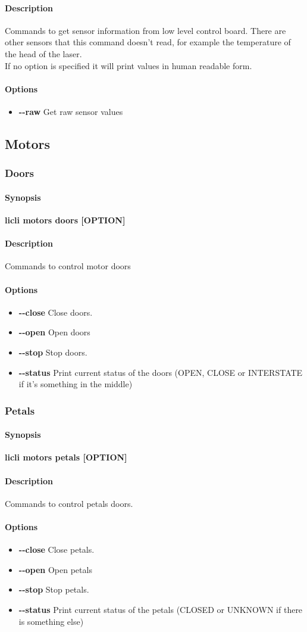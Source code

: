 \documentclass[letterpaper, 10 pt]{article}
\newcommand{\cmdsection}[1]{\paragraph{#1}\mbox{}\par}
\begin{document}
\cmdsection{Description} Commands to get sensor information from low level control board. There are other sensors that this command doesn't read, for example the temperature of the head of the laser.\\
If no option is specified it will print values in human readable form.\\
\cmdsection{Options}
\begin{itemize}
	\item[] \textbf{-{}-raw} Get raw sensor values
\end{itemize}

\subsection{Motors}
\subsubsection{Doors}
\cmdsection{Synopsis} \textbf{licli motors doors [OPTION]}\\

\cmdsection{Description} Commands to control motor doors \\
\cmdsection{Options}
\begin{itemize}
	\item[] \textbf{-{}-close} Close doors.
	\item[] \textbf{-{}-open} Open doors
	\item[] \textbf{-{}-stop} Stop doors. 
	\item[] \textbf{-{}-status} Print current status of the doors (OPEN, CLOSE or INTERSTATE if it's something in the middle)
\end{itemize}
\subsubsection{Petals}
\cmdsection{Synopsis} \textbf{licli motors petals [OPTION]}\\

\cmdsection{Description} Commands to control petals doors.\\
\cmdsection{Options}
\begin{itemize}
	\item[] \textbf{-{}-close} Close petals.
	\item[] \textbf{-{}-open} Open petals
	\item[] \textbf{-{}-stop} Stop petals. 
	\item[] \textbf{-{}-status} Print current status of the petals (CLOSED or UNKNOWN if there is something else)
\end{itemize}
\end{document}
